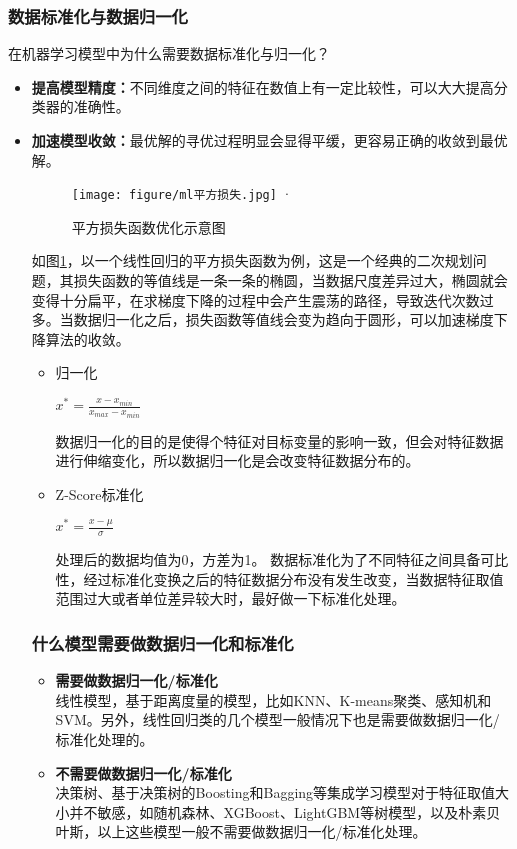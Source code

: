 \documentclass[twoside]{article}
\begin{document}
\subsubsection*{数据标准化与数据归一化}
在机器学习模型中为什么需要数据标准化与归一化？
\begin{itemize}
    \item \textbf{提高模型精度：}不同维度之间的特征在数值上有一定比较性，可以大大提高分类器的准确性。
    \item \textbf{加速模型收敛：}最优解的寻优过程明显会显得平缓，更容易正确的收敛到最优解。
    \begin{figure}[h]
        \centering
        \texttt{[image: figure/ml平方损失.jpg]}
        \label{ml222}·
        \caption{平方损失函数优化示意图}
    \end{figure}
    
    
    如图\ref{ml222}，以一个线性回归的平方损失函数为例，这是一个经典的二次规划问题，其损失函数的等值线是一条一条的椭圆，当数据尺度差异过大，椭圆就会变得十分扁平，在求梯度下降的过程中会产生震荡的路径，导致迭代次数过多。当数据归一化之后，损失函数等值线会变为趋向于圆形，可以加速梯度下降算法的收敛。
    \begin{itemize}
        \item 归一化
        \begin{center}
            $x^*=\frac{x-x_{min}}{x_{max}-x_{min}}$
        \end{center}
        数据归一化的目的是使得个特征对目标变量的影响一致，但会对特征数据进行伸缩变化，所以数据归一化是会改变特征数据分布的。
        \item Z-Score标准化
        \begin{center}
            $x^*=\frac{x-\mu}{\sigma}$
        \end{center}
        处理后的数据均值为0，方差为1。
        数据标准化为了不同特征之间具备可比性，经过标准化变换之后的特征数据分布没有发生改变，当数据特征取值范围过大或者单位差异较大时，最好做一下标准化处理。
    \end{itemize}
\subsubsection*{什么模型需要做数据归一化和标准化}
\begin{itemize}
    \item \textbf{需要做数据归一化/标准化}\\
    线性模型，基于距离度量的模型，比如KNN、K-means聚类、感知机和SVM。另外，线性回归类的几个模型一般情况下也是需要做数据归一化/标准化处理的。
    \item \textbf{不需要做数据归一化/标准化}\\
    决策树、基于决策树的Boosting和Bagging等集成学习模型对于特征取值大小并不敏感，如随机森林、XGBoost、LightGBM等树模型，以及朴素贝叶斯，以上这些模型一般不需要做数据归一化/标准化处理。
\end{itemize}
\end{itemize}
\end{document}

